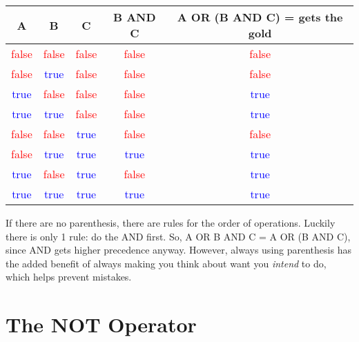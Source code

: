 \begin{center} \end{center}

\begin{center}
	\begin{tabular}{c | c | c | c | c}
		A & B & C & B AND C & A OR (B AND C) = gets the gold\\ \hline
		\textcolor{red}{false} & \textcolor{red}{false} & \textcolor{red}{false} & \textcolor{red}{false} & \textcolor{red}{false}\\ \hline
		\textcolor{red}{false} & \textcolor{blue}{true} & \textcolor{red}{false} & \textcolor{red}{false} & \textcolor{red}{false}\\ \hline
		\textcolor{blue}{true} & \textcolor{red}{false} & \textcolor{red}{false} & \textcolor{red}{false} & \textcolor{blue}{true}\\ \hline
		\textcolor{blue}{true} & \textcolor{blue}{true} & \textcolor{red}{false} & \textcolor{red}{false} & \textcolor{blue}{true}\\ \hline

		\textcolor{red}{false} & \textcolor{red}{false} & \textcolor{blue}{true} & \textcolor{red}{false} & \textcolor{red}{false}\\ \hline
		\textcolor{red}{false} & \textcolor{blue}{true} & \textcolor{blue}{true} & \textcolor{blue}{true} & \textcolor{blue}{true}\\ \hline
		\textcolor{blue}{true} & \textcolor{red}{false} & \textcolor{blue}{true} & \textcolor{red}{false} & \textcolor{blue}{true}\\ \hline
		\textcolor{blue}{true} & \textcolor{blue}{true} & \textcolor{blue}{true} & \textcolor{blue}{true} & \textcolor{blue}{true}\\ \hline
	\end{tabular}
\end{center}


If there are no parenthesis, there are rules for the order of operations. Luckily there is only 1 rule: do the AND first. So, A OR B AND C = A OR (B AND C), since AND gets higher precedence anyway. However, always using parenthesis has the added benefit of always making you think about want you \textit{intend} to do, which helps prevent mistakes.

\section{The NOT Operator}

